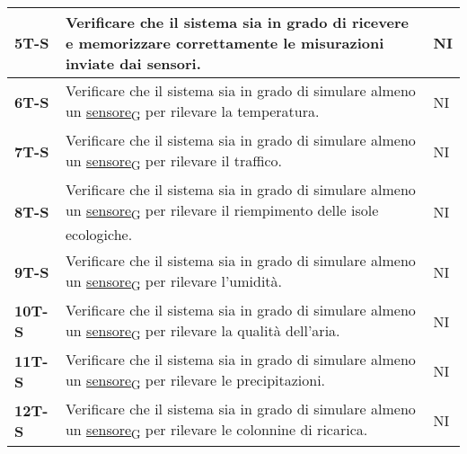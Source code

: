 \begin{longtable}{|>{\raggedright\arraybackslash}m{}|>{\raggedright\arraybackslash}m{}|>{\raggedright\arraybackslash}m{}|}
	\hline
	\textbf{5T-S}   & Verificare che il sistema sia in grado di ricevere e memorizzare correttamente le misurazioni inviate dai sensori.                                                                               & NI             \\
	\hline
	\textbf{6T-S}   & Verificare che il sistema sia in grado di simulare almeno un \href{https://7last.github.io/docs/rtb/documentazione-interna/glossario\#sensore}{sensore\textsubscript{G}} per rilevare la temperatura.                                                                                                & NI             \\
	\hline
	\textbf{7T-S}   & Verificare che il sistema sia in grado di simulare almeno un \href{https://7last.github.io/docs/rtb/documentazione-interna/glossario\#sensore}{sensore\textsubscript{G}} per rilevare il traffico.                                                                                                   & NI             \\
	\hline
	\textbf{8T-S}   & Verificare che il sistema sia in grado di simulare almeno un \href{https://7last.github.io/docs/rtb/documentazione-interna/glossario\#sensore}{sensore\textsubscript{G}} per rilevare il riempimento delle isole ecologiche.                                                                         & NI             \\
	\hline
	\textbf{9T-S}   & Verificare che il sistema sia in grado di simulare almeno un \href{https://7last.github.io/docs/rtb/documentazione-interna/glossario\#sensore}{sensore\textsubscript{G}} per rilevare l'umidità.                                                                                                     & NI             \\
	\hline
	\textbf{10T-S}  & Verificare che il sistema sia in grado di simulare almeno un \href{https://7last.github.io/docs/rtb/documentazione-interna/glossario\#sensore}{sensore\textsubscript{G}} per rilevare la qualità dell'aria.                                                                                          & NI             \\
	\hline
	\textbf{11T-S}  & Verificare che il sistema sia in grado di simulare almeno un \href{https://7last.github.io/docs/rtb/documentazione-interna/glossario\#sensore}{sensore\textsubscript{G}} per rilevare le precipitazioni.                                                                                             & NI             \\
	\hline
	\textbf{12T-S}  & Verificare che il sistema sia in grado di simulare almeno un \href{https://7last.github.io/docs/rtb/documentazione-interna/glossario\#sensore}{sensore\textsubscript{G}} per rilevare le colonnine di ricarica.                                                                                      & NI             \\

\end{longtable}
